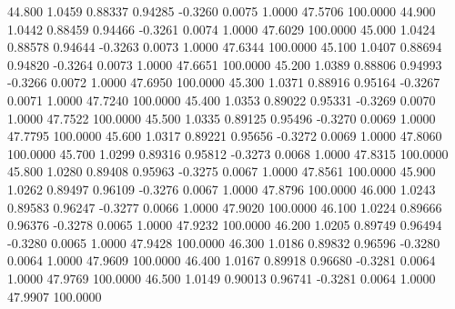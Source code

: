   44.800   1.0459   0.88337   0.94285  -0.3260   0.0075   1.0000  47.5706 100.0000
  44.900   1.0442   0.88459   0.94466  -0.3261   0.0074   1.0000  47.6029 100.0000
  45.000   1.0424   0.88578   0.94644  -0.3263   0.0073   1.0000  47.6344 100.0000
  45.100   1.0407   0.88694   0.94820  -0.3264   0.0073   1.0000  47.6651 100.0000
  45.200   1.0389   0.88806   0.94993  -0.3266   0.0072   1.0000  47.6950 100.0000
  45.300   1.0371   0.88916   0.95164  -0.3267   0.0071   1.0000  47.7240 100.0000
  45.400   1.0353   0.89022   0.95331  -0.3269   0.0070   1.0000  47.7522 100.0000
  45.500   1.0335   0.89125   0.95496  -0.3270   0.0069   1.0000  47.7795 100.0000
  45.600   1.0317   0.89221   0.95656  -0.3272   0.0069   1.0000  47.8060 100.0000
  45.700   1.0299   0.89316   0.95812  -0.3273   0.0068   1.0000  47.8315 100.0000
  45.800   1.0280   0.89408   0.95963  -0.3275   0.0067   1.0000  47.8561 100.0000
  45.900   1.0262   0.89497   0.96109  -0.3276   0.0067   1.0000  47.8796 100.0000
  46.000   1.0243   0.89583   0.96247  -0.3277   0.0066   1.0000  47.9020 100.0000
  46.100   1.0224   0.89666   0.96376  -0.3278   0.0065   1.0000  47.9232 100.0000
  46.200   1.0205   0.89749   0.96494  -0.3280   0.0065   1.0000  47.9428 100.0000
  46.300   1.0186   0.89832   0.96596  -0.3280   0.0064   1.0000  47.9609 100.0000
  46.400   1.0167   0.89918   0.96680  -0.3281   0.0064   1.0000  47.9769 100.0000
  46.500   1.0149   0.90013   0.96741  -0.3281   0.0064   1.0000  47.9907 100.0000
